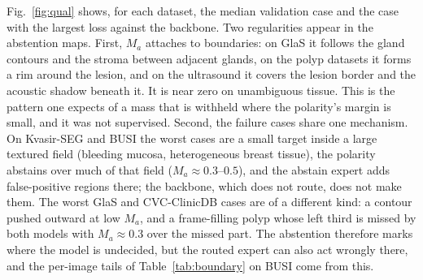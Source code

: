 Fig.~\ref{fig:qual} shows, for each dataset, the median validation case and the case with the largest loss against the backbone. Two regularities appear in the abstention maps. First, $M_a$ attaches to boundaries: on GlaS it follows the gland contours and the stroma between adjacent glands, on the polyp datasets it forms a rim around the lesion, and on the ultrasound it covers the lesion border and the acoustic shadow beneath it. It is near zero on unambiguous tissue. This is the pattern one expects of a mass that is withheld where the polarity's margin is small, and it was not supervised. Second, the failure cases share one mechanism. On Kvasir-SEG and BUSI the worst cases are a small target inside a large textured field (bleeding mucosa, heterogeneous breast tissue), the polarity abstains over much of that field ($M_a\approx0.3$--$0.5$), and the abstain expert adds false-positive regions there; the backbone, which does not route, does not make them. The worst GlaS and CVC-ClinicDB cases are of a different kind: a contour pushed outward at low $M_a$, and a frame-filling polyp whose left third is missed by both models with $M_a\approx0.3$ over the missed part. The abstention therefore marks where the model is undecided, but the routed expert can also act wrongly there, and the per-image tails of Table~\ref{tab:boundary} on BUSI come from this.
